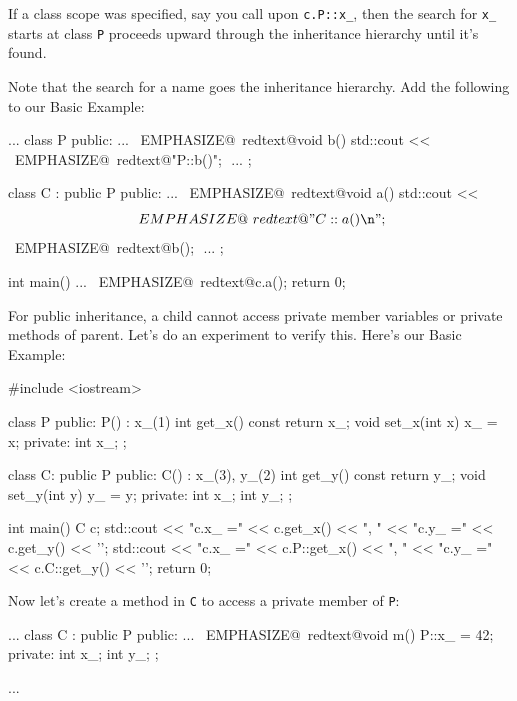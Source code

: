 If a class scope was specified, say you call upon \verb!c.P::x_!, then
the search for \verb!x_! starts at class \verb!P! proceeds upward
through the inheritance hierarchy until it's found.

Note that the search for a name goes  the inheritance
hierarchy. Add the following to our Basic Example:
\begin{console}[commandchars=\~\@\$]
...
class P
{
public:
        ...
        ~EMPHASIZE@~redtext@void b() { std::cout <<$$ 
                   ~EMPHASIZE@~redtext@"P::b()\n"; }$$
        ...
};

class C : public P
{
public:
        ...
        ~EMPHASIZE@~redtext@void a() { std::cout <<$$ 
                   ~EMPHASIZE@~redtext@"C::a()\n";$$
                   ~EMPHASIZE@~redtext@b();  }$$
        ...
};

int main()
{   
    ...
    ~EMPHASIZE@~redtext@c.a();$$
    return 0;
}
\end{console}

\newpage{}

For public inheritance, a child cannot access private member variables
or private methods of parent. Let's do an experiment to verify this.
Here's our Basic Example:
\begin{console}
#include <iostream>

class P
{
public:
        P() : x_(1) {}
        int get_x() const { return x_; }
        void set_x(int x) { x_ = x; }
private:
        int x_;
};

class C: public P
{
public:
        C() : x_(3), y_(2) {}
        int get_y() const { return y_; }
        void set_y(int y) { y_ = y; }
private:
        int x_;
        int y_;
};

int main()
{   
    C c;
    std::cout << "c.x_ =" << c.get_x() << ", "
              << "c.y_ =" << c.get_y() << '\n';
    std::cout << "c.x_ =" << c.P::get_x() << ", "
              << "c.y_ =" << c.C::get_y() << '\n';
return 0;
}
\end{console}

Now let's create a method in \verb!C! to access a private member of
\verb!P!:
\begin{console}[commandchars=\~\@\$]
...
class C : public P
{
public:
        ...
        ~EMPHASIZE@~redtext@void m() { P::x_ = 42; }$$
private:
        int x_;
        int y_;
};

... 
\end{console}

